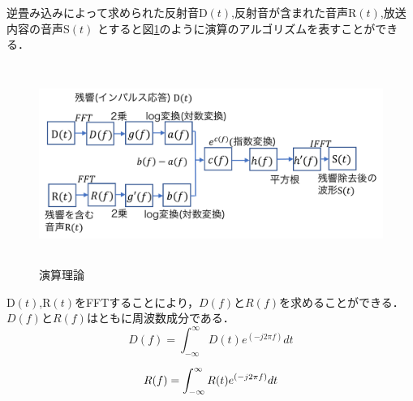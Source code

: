 \documentclass[a4j,11pt]{jsarticle}
\begin{document}
\newpage

逆畳み込みによって求められた反射音D$(t)$,反射音が含まれた音声R$(t)$,放送内容の音声S$(t)$
とすると図\ref{fig:cepst}のように演算のアルゴリズムを表すことができる．

\begin{figure}[h]
\begin{center}
 \includegraphics[clip,width=140mm,height=65mm]{riron.pdf}
\end{center}
 \caption{演算理論}
 \label{fig:cepst}
\end{figure}

D$(t)$,R$(t)$をFFTすることにより，$D(f)$と$R(f)$を求めることができる．$D(f)$と$R(f)$はともに周波数成分である．
{\Large
\begin{equation}
\label{提案手法最初}
  D(f) = \int^{\infty}_{-\infty}D(t)e^{(-j2\pi f)}dt 
\end{equation}
}

{\Large
\begin{equation}
\label{提案手法最初}
  R(f) = \int^{\infty}_{-\infty}R(t)e^{(-j2\pi f)}dt \\
\end{equation}
}
\end{document}
